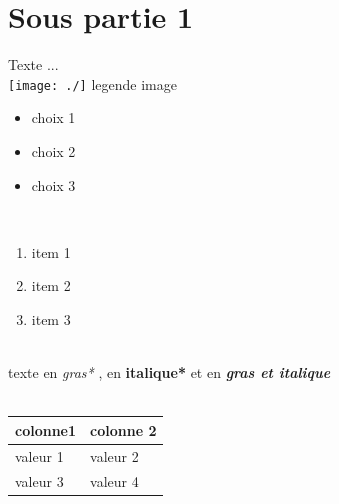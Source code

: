 \documentclass[11pt,fleqn]{book}
\begin{document}
\section{Sous partie 1}
Texte  ...
~\\
\texttt{[image: ./]}
legende image
~\\
\begin{itemize}
\item choix  1
\item choix  2
\item choix  3
\end{itemize}
~\\
\begin{enumerate}
\item item  1
\item item  2
\item item  3 
\end{enumerate}
~\\
texte  en  \textit{gras*} ,  en  \textbf{italique*} et  en  \textbf{\textit{gras et italique}}
~\\
~\\
\begin{tabular}
{|l|l|}
\hline
colonne1 & colonne 2\\
\hline
valeur  1 & valeur  2\\
valeur  3 & valeur  4\\
\hline
\end{tabular}
~\\
~\\
\end{document}
